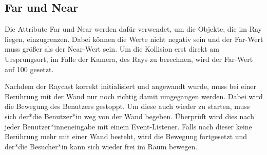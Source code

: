 \subsection{Far und Near}
Die Attribute Far und Near werden dafür verwendet, um die Objekte, die im Ray liegen, einzugrenzen. Dabei können die Werte nicht negativ sein und der Far-Wert muss größer als der Near-Wert sein. Um die Kollision erst direkt am Ursprungsort, im Falle der Kamera, des Rays zu berechnen, wird der Far-Wert auf 100 gesetzt.
   	
Nachdem der Raycast korrekt initialisiert und angewandt wurde, muss bei einer Berührung mit der Wand nur noch richtig damit umgegangen werden. Dabei wird die Bewegung des Benutzers gestoppt. Um diese auch wieder zu starten, muss sich der*die Benutzer*in weg von der Wand begeben. Überprüft wird dies nach jeder Benutzer*inneneingabe mit einem Event-Listener. Falls nach dieser keine Berührung mehr mit einer Wand besteht, wird die Bewegung fortgesetzt und der*die Besucher*in kann sich wieder frei im Raum bewegen.
\newpage

